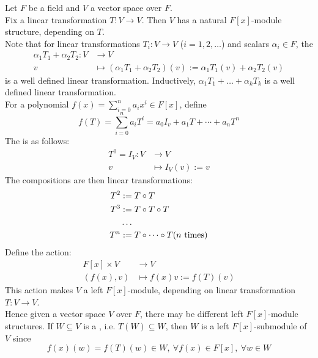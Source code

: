 \begin{definition}
 Let $F$ be a field and $V$ a vector space over $F$.\\
Fix a linear transformation $T: V \rightarrow V$. Then $V$ has a natural $F[x]$-module structure, depending on $T$.\\
Note that for linear transformations $T_i: V \rightarrow V$ ($i = 1, 2, \ldots$) and scalars $\alpha_i \in F$, the 
\begin{align}
\alpha_1 T_1 + \alpha_2 T_2 : V &\rightarrow V \nonumber \\
v &\mapsto (\alpha_1 T_1 + \alpha_2 T_2)(v) := \alpha_1 T_1 (v) + \alpha_2 T_2 (v) \nonumber
\end{align}
is a well defined linear transformation. Inductively, $\alpha_1 T_1 + \ldots + \alpha_k T_k$ is a well defined linear transformation.\\
For a polynomial $f(x) = \sum_{i=0}^n a_i x^i \in F[x]$, define
\begin{equation}
f(T) = \sum_{i=0}^n a_i T^i = a_0 I_v + a_1 T + \cdots + a_n T^n \nonumber
\end{equation}
The  is as follows:
\begin{align}
T^0 = I_V: V &\rightarrow V \nonumber \\
v &\mapsto I_V(v) := v \nonumber
\end{align}
The compositions are then linear transformations: 
\begin{align}
T^2 &:= T \circ T \nonumber \\
T^3 &:= T \circ T \circ T \nonumber \\
&\ldots \nonumber \\
T^n &:= T \circ \cdots \circ T (n \ \textnormal{times}) \nonumber
\end{align}
Define the action:
\begin{align}
F[x] \times V &\rightarrow V \nonumber \\
(f(x), v) &\mapsto f(x)v := f(T)(v) \nonumber
\end{align}
This action makes $V$ a left $F[x]$-module, depending on linear transformation $T:V \rightarrow V$.\\
Hence given a vector space $V$ over $F$, there may be different left $F[x]$-module structures.
If $W \subseteq V$ is a , i.e. $T(W) \subseteq W$, then $W$ is a left $F[x]$-submodule of $V$ since
\begin{equation}
f(x)(w) = f(T)(w) \in W, \ \forall f(x) \in F[x], \ \forall w \in W \nonumber
\end{equation}
\end{definition}

